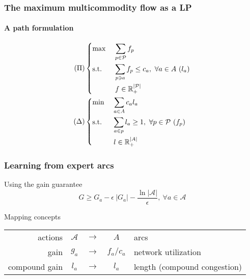 \documentclass{beamer}
\begin{document}
\begin{frame}
    \frametitle{The maximum multicommodity flow as a LP} 
    \framesubtitle{A path formulation}

    \begin{align*}
    (\Pi) & \begin{dcases}
    \max~ & \sum_{p\in\mathcal{P}} f_p\\
    \text{s.t.}~& \sum_{p\ni a} f_p \leq c_a,~\forall a\in A ~(l_a)\\
    & f \in \mathbb{R}_+^{|\mathcal{P}|}
    \end{dcases}
    \\
    (\Delta) & \begin{dcases}
    \min~ & \sum_{a\in A} c_a l_a\\
    \text{s.t.}~& \sum_{a\in p} l_a \geq 1,~\forall p\in \mathcal{P} ~(f_p)\\
    & l \in \mathbb{R}_+^{|A|}
    \end{dcases}
    \end{align*}

\end{frame}

\begin{frame}
    \frametitle{Learning from expert arcs}

    \begin{block}{Using the gain guarantee}
        \begin{equation*}
            G \geq G_a - \epsilon~|G_a| - \dfrac{\ln |\mathcal{A}|}{\epsilon},
            ~\forall a\in \mathcal{A}
        \end{equation*}
    \end{block}

    \begin{block}{Mapping concepts}
    \begin{tabular}{r | c c c | l}
    actions & $\mathcal{A}$ & $\to$ & $A$ & arcs\\
    gain & $g_a$ & $\to$ & $f_a / c_a$ & network utilization\\
    compound gain & $l_a$ & $\to$ & $l_a$ & length (compound congestion)
    \end{tabular}
    \end{block}

\end{frame}
\end{document}
